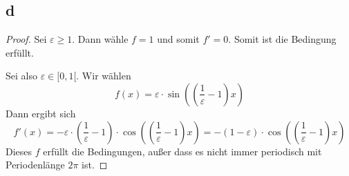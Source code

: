 \documentclass[10pt,a4paper]{article}
\begin{document}
\subsection*{d}

\begin{proof}
Sei $\varepsilon \ge 1$.
Dann wähle $f = 1$ und somit $f' = 0$.
Somit ist die Bedingung erfüllt.

Sei also $\varepsilon \in [0, 1[$.
Wir wählen
\begin{equation}
f(x) = \varepsilon \cdot \sin \left( (\frac{1}{\varepsilon} - 1) x \right)
\end{equation}
Dann ergibt sich
\begin{equation}
f'(x) = -\varepsilon \cdot (\frac{1}{\varepsilon} - 1) \cdot \cos \left( (\frac{1}{\varepsilon} - 1) x \right) = -(1 - \varepsilon) \cdot \cos \left( (\frac{1}{\varepsilon} - 1) x \right)
\end{equation}
Dieses $f$ erfüllt die Bedingungen, außer dass es nicht immer periodisch mit Periodenlänge $2\pi$ ist.
\end{proof}
\end{document}
